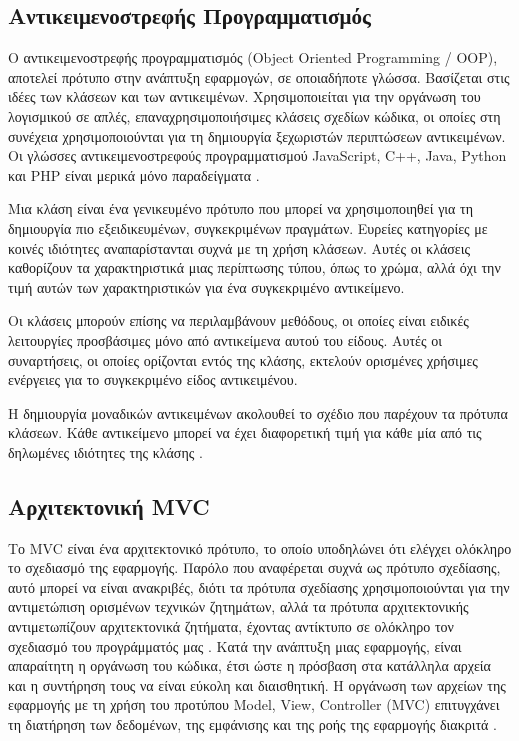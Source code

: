 \subsection{Αντικειμενοστρεφής Προγραμματισμός}
Ο αντικειμενοστρεφής προγραμματισμός (Object Oriented Programming / OOP), αποτελεί πρότυπο στην ανάπτυξη εφαρμογών, σε οποιαδήποτε γλώσσα. Βασίζεται στις ιδέες των κλάσεων και των αντικειμένων. Χρησιμοποιείται για την οργάνωση του λογισμικού σε απλές, επαναχρησιμοποιήσιμες κλάσεις σχεδίων κώδικα, οι οποίες στη συνέχεια χρησιμοποιούνται για τη δημιουργία ξεχωριστών περιπτώσεων αντικειμένων. Οι γλώσσες αντικειμενοστρεφούς προγραμματισμού JavaScript, C++, Java, Python και PHP είναι μερικά μόνο παραδείγματα \cite{smith2011object}.

Μια κλάση είναι ένα γενικευμένο πρότυπο που μπορεί να χρησιμοποιηθεί για τη δημιουργία πιο εξειδικευμένων, συγκεκριμένων πραγμάτων. Ευρείες κατηγορίες με κοινές ιδιότητες αναπαρίστανται συχνά με τη χρήση κλάσεων. Αυτές οι κλάσεις καθορίζουν τα χαρακτηριστικά μιας περίπτωσης τύπου, όπως το χρώμα, αλλά όχι την τιμή αυτών των χαρακτηριστικών για ένα συγκεκριμένο αντικείμενο.

Οι κλάσεις μπορούν επίσης να περιλαμβάνουν μεθόδους, οι οποίες είναι ειδικές λειτουργίες προσβάσιμες μόνο από αντικείμενα αυτού του είδους. Αυτές οι συναρτήσεις, οι οποίες ορίζονται εντός της κλάσης, εκτελούν ορισμένες χρήσιμες ενέργειες για το συγκεκριμένο είδος αντικειμένου.

Η δημιουργία μοναδικών αντικειμένων ακολουθεί το σχέδιο που παρέχουν τα πρότυπα κλάσεων. Κάθε αντικείμενο μπορεί να έχει διαφορετική τιμή για κάθε μία από τις δηλωμένες ιδιότητες της κλάσης \cite{Doherty_2020}.


\subsection{Αρχιτεκτονική MVC}
Το MVC είναι ένα αρχιτεκτονικό πρότυπο, το οποίο υποδηλώνει ότι ελέγχει ολόκληρο το σχεδιασμό της εφαρμογής. Παρόλο που αναφέρεται συχνά ως πρότυπο σχεδίασης, αυτό μπορεί να είναι ανακριβές, διότι τα πρότυπα σχεδίασης χρησιμοποιούνται για την αντιμετώπιση ορισμένων τεχνικών ζητημάτων, αλλά τα πρότυπα αρχιτεκτονικής αντιμετωπίζουν αρχιτεκτονικά ζητήματα, έχοντας αντίκτυπο σε ολόκληρο τον σχεδιασμό του προγράμματός μας \cite{Svirca_2020}. Κατά την ανάπτυξη μιας εφαρμογής, είναι απαραίτητη η οργάνωση του κώδικα, έτσι ώστε η πρόσβαση στα κατάλληλα αρχεία και η συντήρηση τους να είναι εύκολη και διαισθητική. Η οργάνωση των αρχείων της εφαρμογής με τη χρήση του προτύπου Model, View, Controller (MVC) επιτυγχάνει τη διατήρηση των δεδομένων, της εμφάνισης και της ροής της εφαρμογής διακριτά \cite{CodeIgniter_mvc}.

